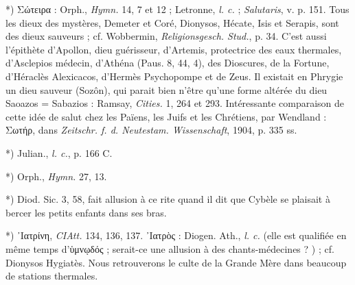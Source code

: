 \documentclass[a4paper, 11pt, oneside, polutonikogreek, french]{article}
\begin{document}
*) Σώτειρα : Orph., \emph{Hymn.} 14, 7 et 12 ; Letronne, \emph{l. c.} ; \emph{Salutaris}, v. p. 151. Tous les dieux des mystères, Demeter et Coré, Dionysos, Hécate, Isis et Serapis, sont des dieux sauveurs ; cf. Wobbermin, \emph{Religionsgesch. Stud.}, p. 34. C'est aussi l'épithète d'Apollon, dieu guérisseur, d'Artemis, protectrice des eaux thermales, d'Asclepios médecin, d'Athéna (Paus. 8, 44, 4), des Dioscures, de la Fortune, d'Héraclès Alexicacos, d'Hermès Psychopompe et de Zeus. Il existait en Phrygie un dieu sauveur (Sozôn), qui parait bien n'être qu'une forme altérée du dieu Saoazos = Sabazios : Ramsay, \emph{Cities.} 1, 264 et 293. Intéressante comparaison de cette idée de salut chez les Païens, les Juifs et les Chrétiens, par Wendland : Σωτήρ, dans \emph{Zeitschr. f. d. Neutestam. Wissenschaft}, 1904, p. 335 ss.

*) Julian., \emph{l. c.}, p. 166 C.

*) Orph., \emph{Hymn.} 27, 13.

*) Diod. Sic. 3, 58, fait allusion à ce rite quand il dit que Cybèle se plaisait à bercer les petits enfants dans ses bras.

*) ᾿Ιατρίνη, \emph{CIAtt.} 134, 136, 137. ᾿Ιατρὸς : Diogen. Ath., \emph{l. c.} (elle est qualifiée en même temps d'ὑμνῳδός ; serait-ce une allusion à des chants-médecines ? ) ; cf. Dionysos Hygiatès. Nous retrouverons le culte de la Grande Mère dans beaucoup de stations thermales.
\end{document}

